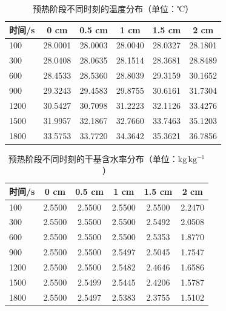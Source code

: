 \begin{table}[htbp]
\centering
\caption{预热阶段不同时刻的温度分布（单位：℃）}
\label{tab:t1}
\begin{tabular}{lccccc}
\toprule
时间/s & 0 cm & 0.5 cm & 1 cm & 1.5 cm & 2 cm \\
\midrule
100 & 28.0001 & 28.0003 & 28.0040 & 28.0327 & 28.1801 \\
300 & 28.0408 & 28.0635 & 28.1514 & 28.3681 & 28.8489 \\
600 & 28.4533 & 28.5360 & 28.8039 & 29.3159 & 30.1652 \\
900 & 29.3243 & 29.4583 & 29.8755 & 30.6161 & 31.7304 \\
1200 & 30.5427 & 30.7098 & 31.2223 & 32.1126 & 33.4276 \\
1500 & 31.9957 & 32.1867 & 32.7660 & 33.7463 & 35.1203 \\
1800 & 33.5753 & 33.7720 & 34.3642 & 35.3621 & 36.7856 \\
\bottomrule
\end{tabular}
\end{table}

\begin{table}[htbp]
\centering
\caption{预热阶段不同时刻的干基含水率分布（单位：$\mathrm{kg\,kg^{-1}}$）}
\label{tab:t2}
\begin{tabular}{lccccc}
\toprule
时间/s & 0 cm & 0.5 cm & 1 cm & 1.5 cm & 2 cm \\
\midrule
100 & 2.5500 & 2.5500 & 2.5500 & 2.5500 & 2.2470 \\
300 & 2.5500 & 2.5500 & 2.5500 & 2.5492 & 2.0508 \\
600 & 2.5500 & 2.5500 & 2.5500 & 2.5353 & 1.8770 \\
900 & 2.5500 & 2.5500 & 2.5497 & 2.5045 & 1.7547 \\
1200 & 2.5500 & 2.5500 & 2.5482 & 2.4646 & 1.6586 \\
1500 & 2.5500 & 2.5499 & 2.5445 & 2.4206 & 1.5787 \\
1800 & 2.5500 & 2.5497 & 2.5383 & 2.3755 & 1.5102 \\
\bottomrule
\end{tabular}
\end{table}

